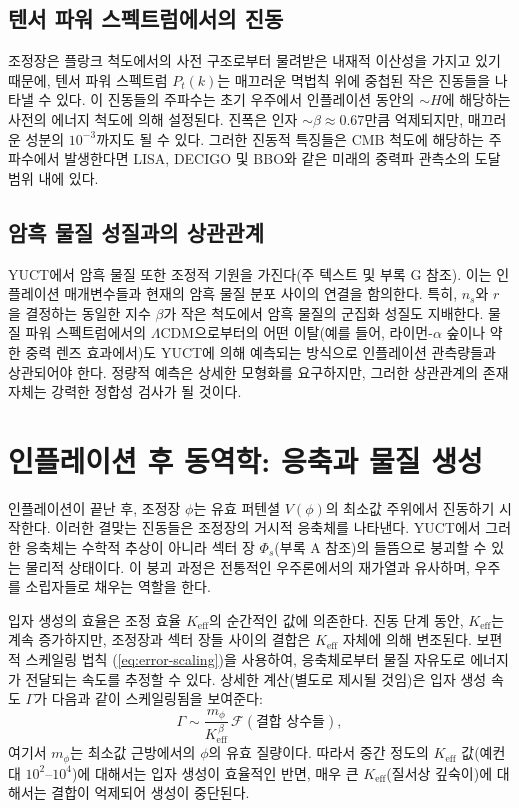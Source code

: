 \documentclass[11pt,a4paper]{article}
\newcommand{\Keff}{K_{\mathrm{eff}}}
\begin{document}
	\subsection{텐서 파워 스펙트럼에서의 진동}
	
	조정장은 플랑크 척도에서의 사전 구조로부터 물려받은 내재적 이산성을 가지고 있기 때문에, 텐서 파워 스펙트럼 \(P_t(k)\)는 매끄러운 멱법칙 위에 중첩된 작은 진동들을 나타낼 수 있다. 이 진동들의 주파수는 초기 우주에서 인플레이션 동안의 \(\sim H\)에 해당하는 사전의 에너지 척도에 의해 설정된다. 진폭은 인자 \(\sim \beta \approx 0.67\)만큼 억제되지만, 매끄러운 성분의 \(10^{-3}\)까지도 될 수 있다. 그러한 진동적 특징들은 CMB 척도에 해당하는 주파수에서 발생한다면 LISA, DECIGO 및 BBO와 같은 미래의 중력파 관측소의 도달 범위 내에 있다.
	
	\subsection{암흑 물질 성질과의 상관관계}
	
	YUCT에서 암흑 물질 또한 조정적 기원을 가진다(주 텍스트 및 부록 G 참조). 이는 인플레이션 매개변수들과 현재의 암흑 물질 분포 사이의 연결을 함의한다. 특히, \(n_s\)와 \(r\)을 결정하는 동일한 지수 \(\beta\)가 작은 척도에서 암흑 물질의 군집화 성질도 지배한다. 물질 파워 스펙트럼에서의 \(\Lambda\)CDM으로부터의 어떤 이탈(예를 들어, 라이먼-\(\alpha\) 숲이나 약한 중력 렌즈 효과에서)도 YUCT에 의해 예측되는 방식으로 인플레이션 관측량들과 상관되어야 한다. 정량적 예측은 상세한 모형화를 요구하지만, 그러한 상관관계의 존재 자체는 강력한 정합성 검사가 될 것이다.
	
	\section{인플레이션 후 동역학: 응축과 물질 생성}
	\label{sec:postinflation}
	
	인플레이션이 끝난 후, 조정장 \(\phi\)는 유효 퍼텐셜 \(V(\phi)\)의 최소값 주위에서 진동하기 시작한다. 이러한 결맞는 진동들은 조정장의 거시적 응축체를 나타낸다. YUCT에서 그러한 응축체는 수학적 추상이 아니라 섹터 장 \(\Phi_s\)(부록 A 참조)의 들뜸으로 붕괴할 수 있는 물리적 상태이다. 이 붕괴 과정은 전통적인 우주론에서의 재가열과 유사하며, 우주를 소립자들로 채우는 역할을 한다.
	
	입자 생성의 효율은 조정 효율 \(\Keff\)의 순간적인 값에 의존한다. 진동 단계 동안, \(\Keff\)는 계속 증가하지만, 조정장과 섹터 장들 사이의 결합은 \(\Keff\) 자체에 의해 변조된다. 보편적 스케일링 법칙 (\ref{eq:error-scaling})을 사용하여, 응축체로부터 물질 자유도로 에너지가 전달되는 속도를 추정할 수 있다. 상세한 계산(별도로 제시될 것임)은 입자 생성 속도 \(\Gamma\)가 다음과 같이 스케일링됨을 보여준다:
	\begin{equation}
		\Gamma \sim \frac{m_\phi}{\Keff^{\,\beta}} \, \mathcal{F}(\text{결합 상수들}),
		\label{eq:gamma}
	\end{equation}
	여기서 \(m_\phi\)는 최소값 근방에서의 \(\phi\)의 유효 질량이다. 따라서 중간 정도의 \(\Keff\) 값(예컨대 \(10^2\)–\(10^4\))에 대해서는 입자 생성이 효율적인 반면, 매우 큰 \(\Keff\)(질서상 깊숙이)에 대해서는 결합이 억제되어 생성이 중단된다.
	
\end{document}
